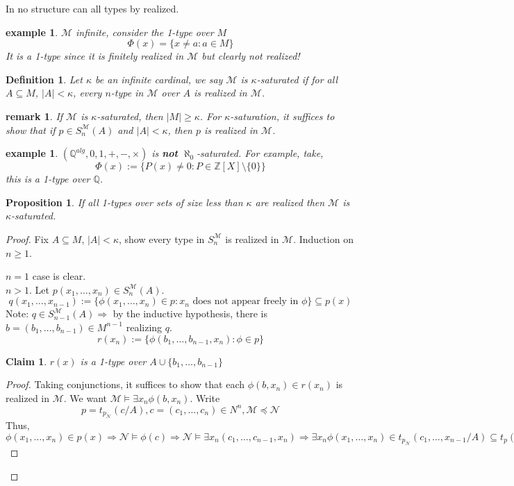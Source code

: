 \documentclass[letterpaper, 12pt]{article}
\newcommand{\fin}{\qquad \quad \hfill \framebox[1.75mm][l]{\,}}
\newcommand{\cM}{\mathcal{M}}
\newcommand{\cN}{\mathcal{N}}
\newcommand{\bZ}{\mathbb{Z}}
\newcommand{\bQ}{\mathbb{Q}}
\theoremstyle{stdthm}
\newtheorem{prop}[thm]{Proposition}
\theoremstyle{stddef}
\newtheorem{defn}[thm]{Definition}
\newtheorem{rem}[thm]{remark} %
\newtheorem{eg}[thm]{example} %
\theoremstyle{stdnonum}
\newtheorem{claim}{Claim}
\theoremstyle{stdqands}
\theoremstyle{stdbold}
\begin{document}
In no structure can all types by realized. 

\begin{eg}
$\cM$ infinite, consider the 1-type over $M$ 
\[ \Phi(x) = \{x \neq a: a \in M \} \]
It is a 1-type since it is finitely realized in $\cM$ but clearly not realized! 
\end{eg}

\begin{defn}
Let $\kappa$ be an infinite cardinal, we say $\cM$ is $\kappa$-saturated if for all $A \subseteq M$, $|A| < \kappa$, every $n$-type in $\cM$ over $A$ is realized in $\cM$. 
\end{defn}

\begin{rem}
If $\cM$ is $\kappa$-saturated, then $|M|\geq \kappa$. For $\kappa$-saturation, it suffices to show that if $p \in S_n^\cM(A)$ and $|A|<\kappa$, then $p$ is realized in $\cM$. 
\end{rem}

\begin{eg}
$(\bQ^{alg},0,1,+,-,\times)$ is {\bf not} $\aleph_0$-saturated. For example, take, 
\[ \Phi(x) := \{P(x) \neq 0: P \in \bZ[X]\setminus \{0\} \} \]
this is a 1-type over $\bQ$. 
\end{eg}

\begin{prop} \label{2dot6}
If all 1-types over sets of size less than $\kappa$ are realized then $\cM$ is $\kappa$-saturated. 
\end{prop}

\begin{proof}
Fix $A \subseteq M$, $|A|< \kappa$, show every type in $S_n^\cM$ is realized in $\cM$. Induction on $n \geq 1$. 

\noindent $n = 1$ case is clear. \\

\noindent $n>1$. Let $p(x_1,\dots, x_n) \in S_n^\cM(A)$. 
\[ q(x_1,\dots, x_{n-1}) := \{\phi(x_1,\dots, x_n) \in p: x_n \mbox{ does not appear freely in }\phi\} \subseteq p(x) \]
Note: $q \in S_{n-1}^\cM (A) \Rightarrow $ by the inductive hypothesis, there is $b = (b_1,\dots, b_{n-1}) \in M^{n-1}$ realizing $q$. 
\[ r(x_n) := \{ \phi(b_1,\dots, b_{n-1}, x_n): \phi \in p\} \]

\begin{claim} $r(x)$ is a 1-type over $A \cup \{b_1,\dots, b_{n-1}\}$ 
\end{claim}

\begin{proof}
Taking conjunctions, it suffices to show that each $\phi(b,x_n) \in r(x_n)$ is realized in $\cM$. We want $\cM \models \exists x_n \phi(b,x_n)$. Write 
\[ p = t_{p_\cN}(c/A), c = (c_1,\dots, c_n) \in N^n, \cM \preceq \cN\]
Thus, $\phi(x_1,\dots, x_n)\in p(x) \Rightarrow \cN \models \phi(c)  \Rightarrow \cN \models \exists x_n(c_1,\dots, c_{n-1}, x_n) \Rightarrow \exists x_n \phi(x_1,\dots, x_n) \in t_{p_\cN} (c_1,\dots, x_{n-1}/A) \subseteq t_p(c_1,\dots, c_n/A) = p \Rightarrow \exists x_n \phi(x_1,\dots, x_{n-1}, x_n ) \in q$    
\end{proof}
\end{proof}
\end{document}
